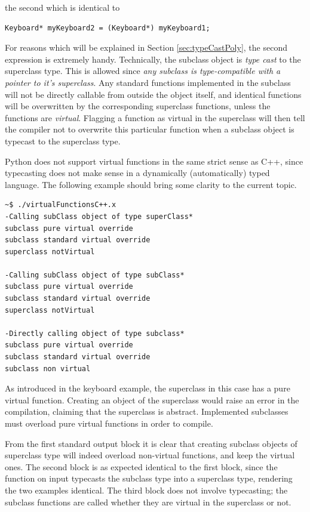 the second which is identical to 

\begin{lstlisting}
Keyboard* myKeyboard2 = (Keyboard*) myKeyboard1;
\end{lstlisting}

For reasons which will be explained in Section \ref{sec:typeCastPoly}, the second expression is extremely handy. Technically, the subclass object is \textit{type cast} to the superclass type. This is allowed since \textit{any subclass is type-compatible with a pointer to it's superclass}. Any standard functions implemented in the subclass will not be directly callable from outside the object itself, and identical functions will be overwritten by the corresponding superclass functions, unless the functions are \textit{virtual}. Flagging a function as virtual in the superclass will then tell the compiler not to overwrite this particular function when a subclass object is typecast to the superclass type.

Python does not support virtual functions in the same strict sense as C++, since typecasting does not make sense in a dynamically (automatically) typed language. The following example should bring some clarity to the current topic.

\vspace{0.5 cm}

\clearpage


\begin{verbatim}
~$ ./virtualFunctionsC++.x 
-Calling subClass object of type superClass*
subclass pure virtual override
subclass standard virtual override
superclass notVirtual

-Calling subClass object of type subClass*
subclass pure virtual override
subclass standard virtual override
superclass notVirtual

-Directly calling object of type subclass*
subclass pure virtual override
subclass standard virtual override
subclass non virtual
\end{verbatim}

As introduced in the keyboard example, the superclass in this case has a pure virtual function. Creating an object of the superclass would raise an error in the compilation, claiming that the superclass is abstract. Implemented subclasses must overload pure virtual functions in order to compile.

From the first standard output block it is clear that creating subclass objects of superclass type will indeed overload non-virtual functions, and keep the virtual ones. The second block is as expected identical to the first block, since the function on input typecasts the subclass type into a superclass type, rendering the two examples identical. The third block does not involve typecasting; the subclass functions are called whether they are virtual in the superclass or not.


